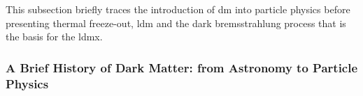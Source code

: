 



This subsection briefly traces the introduction of \gls{dm} into particle
physics before presenting thermal freeze-out, \gls{ldm} and the dark
bremsstrahlung process that is the basis for the \gls{ldmx}.

\subsubsection{A Brief History of Dark Matter: from Astronomy to Particle Physics}
\label{sec:history}


